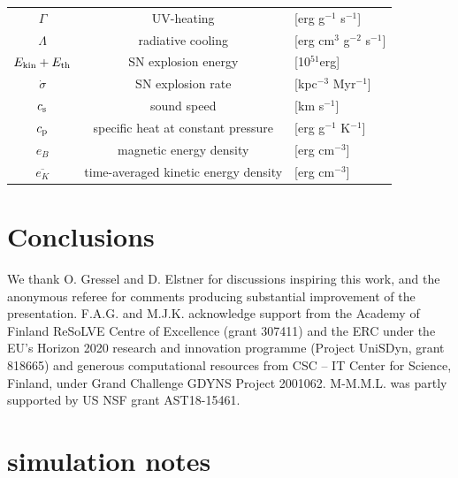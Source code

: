\documentclass[preprint2]{aastex63}
\newcommand\ESK{E_{\rm kin}}
\newcommand\EST{E_{\rm th}}
\begin{document}
\begin{table}[h]
\begin{tabular}{ccl}
 $\Gamma$ & UV-heating& [erg g$^{-1}$ s$^{-1}$]\\
 $\Lambda$ & radiative cooling& [erg cm$^{3}$ g$^{-2}$ s$^{-1}$]\\
 $\ESK+\EST$ & SN explosion energy& [10$^{51}$erg]\\
 $\dot\sigma$ & SN explosion rate & [kpc$^{-3}$ Myr$^{-1}$]\\
 $c_{\rm s}$ & sound speed & [km s$^{-1}$]\\
 $c_{\rm p}$ & specific heat at constant pressure & [erg g$^{-1}$ K$^{-1}$]\\
 $e_B$ & magnetic energy density & [erg cm$^{-3}$]\\
 $\overline{e_K}$ & time-averaged kinetic energy density & [erg cm$^{-3}$]\\
\hline
\end{tabular}
\end{table}


\section{Conclusions}\label{sec:conc}

\acknowledgments
 {We thank O. Gressel and D. Elstner for discussions inspiring this work,
 and the anonymous referee for comments producing substantial improvement of
 the presentation.}
 F.A.G. and M.J.K. acknowledge support from the Academy of Finland
 ReSoLVE Centre of Excellence (grant 307411) and the ERC
 under the EU's Horizon 2020 research and innovation
 programme (Project UniSDyn, grant 818665) and generous computational
 resources from CSC -- IT Center for Science, Finland, under Grand
 Challenge GDYNS Project 2001062. 
 M-M.M.L. was partly supported by US NSF grant AST18-15461.



{}
\newpage
\section*{simulation notes}
\end{document}
